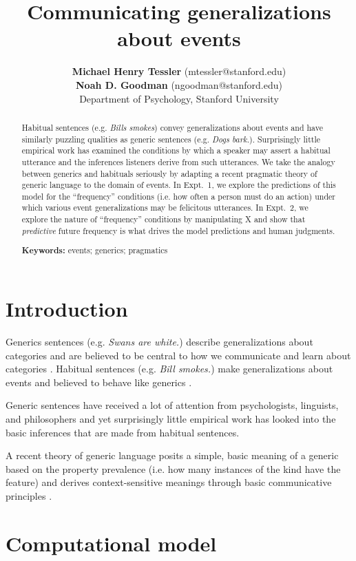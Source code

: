 \documentclass[10pt,letterpaper]{article}
\title{Communicating generalizations about events}
\author{{\large \bf Michael Henry Tessler} (mtessler@stanford.edu) \\ {\large \bf Noah D. Goodman} (ngoodman@stanford.edu) \\
  Department of Psychology, Stanford University}
\begin{document}
\maketitle


\begin{abstract}
Habitual sentences (e.g. \emph{Bills smokes}) convey generalizations about events and have similarly puzzling qualities as generic sentences (e.g. \emph{Dogs bark.}). 
Surprisingly little empirical work has examined the conditions by which a speaker may assert a habitual utterance and the inferences listeners derive from such utterances.
We take the analogy between generics and habituals seriously by adapting a recent pragmatic theory of generic language to the domain of events.
In Expt.~1, we explore the predictions of this model for the ``frequency'' conditions (i.e. how often a person must do an action) under which various event generalizations may be felicitous utterances. 
In Expt.~2, we explore the nature of ``frequency'' conditions by manipulating X and show that \emph{predictive} future frequency is what drives the model predictions and human judgments. 

\textbf{Keywords:} 
events; generics; pragmatics
\end{abstract}


\section{Introduction}

Generics sentences (e.g. \emph{Swans are white.}) describe generalizations about categories and are believed to be central to how we communicate and learn about categories \cite{Carlson1977, Gelman2004}.
Habitual sentences (e.g. \emph{Bill smokes.}) make generalizations about events and believed to behave like generics \cite{Carlson2005}.

Generic sentences have received a lot of attention from psychologists, linguists, and philosophers and yet surprisingly little empirical work has looked into the basic inferences that are made from habitual sentences.

A recent theory of generic language posits a simple, basic meaning of a generic based on the property prevalence (i.e. how many instances of the kind have the feature) and derives context-sensitive meanings through basic communicative principles \cite{TesslerUnderReview}.

\section{Computational model}
\end{document}
